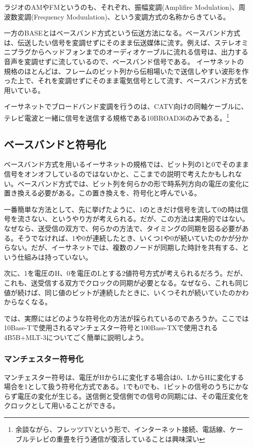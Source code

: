 ラジオのAMやFMというのも、それぞれ、振幅変調(Amplifire Modulation)、周波数変調(Frequency Moduulation)、という変調方式の名称からきている。

一方のBASEとはベースバンド方式という伝送方法になる。ベースバンド方式は、伝送したい信号を変調せずにそのまま伝送媒体に流す。例えば、ステレオミニプラグからヘッドフォンまでのオーディオケーブルに流れる信号は、出力する音声を変調せずに流しているので、ベースバンド信号である。
イーサネットの規格のほとんどは、フレームのビット列から伝相場いたで送信しやすい波形を作った上で、それを変調せずにそのまま電気信号として流す、ベースバンド方式を用いている。

イーサネットでブロードバンド変調を行うのは、CATV向けの同軸ケーブルに、テレビ電波と一緒に信号を送信する規格である10BROAD36のみである。\footnote{余談ながら、フレッツTVという形で、インターネット接続、電話線、ケーブルテレビの重畳を行う通信が復活していることは興味深い}

\subsection{ベースバンドと符号化}

ベースバンド方式を用いるイーサネットの規格では、ビット列の1と0でそのまま信号をオンオフしているのではないかと、ここまでの説明で考えたかもしれない。ベースバンド方式では、ビット列を何らかの形で時系列方向の電圧の変化に置き換える必要がある。この置き換えを、符号化と呼んでいる。

一番簡単な方法として、先に挙げたように、1のときだけ信号を流して0の時は信号を流さない、というやり方が考えられる。だが、この方法は実用的ではない。なぜなら、送受信の双方で、何らかの方法で、タイミングの同期を図る必要がある。そうでなければ、1や0が連続したとき、いくつ1や0が続いていたのかが分からない。だが、イーサネットでは、複数のノードが同期した時計を共有する、という仕組みは持っていない。

次に、1を電圧のH、0を電圧のLとする2値符号方式が考えられるだろう。だが、これも、送受信する双方でクロックの同期が必要となる。なぜなら、これも同じ値が続けば、同じ値のビットが連続したときに、いくつそれが続いていたのかわからなくなる。

では、実際にはどのような符号化の方法が採られているのであろうか。ここでは10Base-Tで使用されるマンチェスター符号と100Base-TXで使用される4B5B+MLT-3についてごく簡単に説明しよう。

\subsubsection{マンチェスター符号化}
マンチェスター符号は、電圧がHからLに変化する場合は0、LからHに変化する場合を1として扱う符号化方式である。1でも0でも、1ビットの信号のうちにかならず電圧の変化が生じる。送信側と受信側での信号の同期には、その電圧変化をクロックとして用いることができる。

